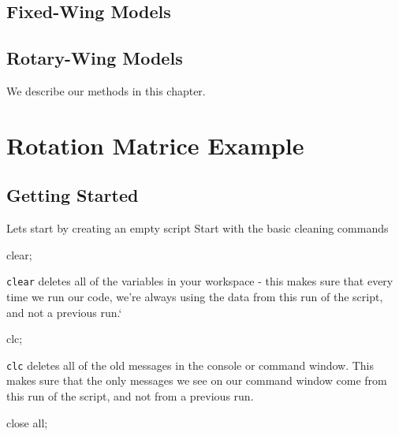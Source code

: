 \documentclass[
]{book}
\newenvironment{Shaded}{\begin{snugshade}}{\end{snugshade}}
\newcommand{\NormalTok}[1]{#1}
\theoremstyle{definition}
\theoremstyle{definition}
\theoremstyle{definition}
\theoremstyle{definition}
\theoremstyle{remark}
\begin{document}
\hypertarget{fixed-wing-models}{%
\section{Fixed-Wing Models}\label{fixed-wing-models}}

\hypertarget{rotary-wing-models}{%
\section{Rotary-Wing Models}\label{rotary-wing-models}}

We describe our methods in this chapter.

\hypertarget{rotation-matrice-example}{%
\chapter{Rotation Matrice Example}\label{rotation-matrice-example}}

\hypertarget{getting-started}{%
\section{Getting Started}\label{getting-started}}

Lets start by creating an empty script Start with the basic cleaning commands

\begin{Shaded}
\begin{Highlighting}[]
\NormalTok{clear; }
\end{Highlighting}
\end{Shaded}

\texttt{clear} deletes all of the variables in your workspace - this makes sure that every time we run our code, we're always using the data from this run of the script, and not a previous run.`

\begin{Shaded}
\begin{Highlighting}[]
\NormalTok{clc; }
\end{Highlighting}
\end{Shaded}

\texttt{clc} deletes all of the old messages in the console or command window. This makes sure that the only messages we see on our command window come from this run of the script, and not from a previous run.

\begin{Shaded}
\begin{Highlighting}[]
\NormalTok{close all; }
\end{Highlighting}
\end{Shaded}
\end{document}
